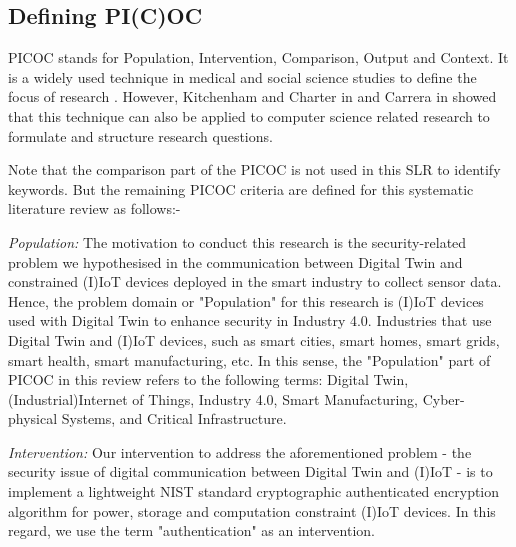 
\subsection{Defining PI(C)OC}
PICOC stands for Population, Intervention, Comparison, Output and Context. It is a widely used technique in medical and social science studies to define the focus of research \cite{carrera-rivera_how-conduct_2022}. However, Kitchenham and Charter in \cite{kitchenham_guidelines_2007} and Carrera in \cite{carrera-rivera_how-conduct_2022} showed that this technique can also be applied to computer science related research to formulate and structure research questions. 

Note that the comparison part of the PICOC is not used in this SLR to identify keywords. But the remaining  PICOC criteria are defined for this systematic literature review as follows:-

\textit{Population:} The motivation to conduct this research is the security-related problem we hypothesised in the communication between Digital Twin and constrained  (I)IoT devices deployed in the smart industry to collect sensor data. Hence, the problem domain or "Population" for this research is (I)IoT devices used with Digital Twin to enhance security in Industry 4.0. Industries that use Digital Twin and (I)IoT devices, such as smart cities, smart homes, smart grids, smart health, smart manufacturing, etc. In this sense, the "Population" part of PICOC in this review refers to the following terms: Digital Twin, (Industrial)Internet of Things, Industry 4.0, Smart Manufacturing, Cyber-physical Systems, and Critical Infrastructure. 

\textit{Intervention:} Our intervention to address the aforementioned problem - the security issue of digital communication between Digital Twin and (I)IoT - is to implement a lightweight NIST standard cryptographic authenticated encryption algorithm for power, storage and computation constraint (I)IoT devices. In this regard, we use the term "authentication" as an intervention.




